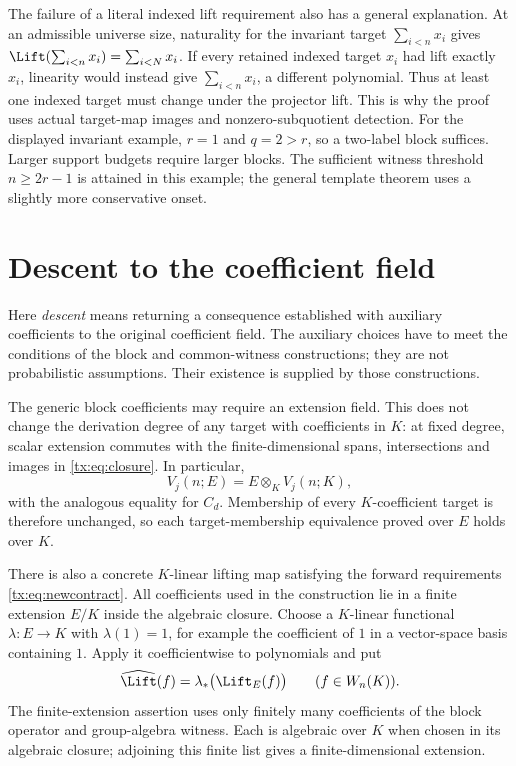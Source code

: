 The failure of a literal indexed lift requirement also has a general
explanation. At an admissible universe size, naturality for the invariant target
$\sum_{i<n}x_i$ gives
$\Lift(\sum_{i<n}x_i)=\sum_{i<N}x_i$. If every retained indexed
target $x_i$ had lift exactly $x_i$, linearity would instead give
$\sum_{i<n}x_i$, a different polynomial. Thus at least one indexed
target must change under the projector lift. This is why the proof
uses actual target-map images and nonzero-subquotient detection.
For the displayed invariant example,
$r=1$ and $q=2>r$, so a two-label block suffices. Larger
support budgets require larger blocks. The sufficient witness threshold
$n\ge2r-1$ is attained in this example; the general template theorem
uses a slightly more conservative onset.

\section{Descent to the coefficient field}\label{tx:lift-sec:descent}
Here \emph{descent} means returning a consequence established with
auxiliary coefficients to the original coefficient field.
The auxiliary choices have to meet the conditions of the block and
common-witness constructions; they are not probabilistic assumptions.
Their existence is supplied by those constructions.

The generic block coefficients may require an extension field. This
does not change the derivation degree of any target with coefficients in $K$: at fixed degree, scalar extension
commutes with the finite-dimensional spans, intersections and images
in \eqref{tx:eq:closure}. In particular,
\[
                       V_j(n;E)=E\otimes_K V_j(n;K),
\]
with the analogous equality for $C_d$. Membership of every $K$-coefficient target is therefore unchanged,
so each target-membership equivalence proved over $E$ holds over $K$.

There is also a concrete $K$-linear lifting map satisfying the forward
requirements \eqref{tx:eq:newcontract}. All coefficients used in the
construction lie in a finite extension $E/K$ inside the algebraic
closure. Choose a $K$-linear functional $\lambda:E\to K$ with
$\lambda(1)=1$, for example the coefficient of $1$ in a vector-space
basis containing $1$. Apply it coefficientwise to polynomials and put
\begin{equation}\label{tx:lift-eq:fieldlift}
                 \widehat\Lift(f)=\lambda_*\bigl(\Lift_E(f)\bigr)
                      \qquad(f\in W_n(K)).
\end{equation}
The finite-extension assertion uses only finitely many coefficients
of the block operator and group-algebra witness. Each is algebraic
over $K$ when chosen in its algebraic closure; adjoining this finite
list gives a finite-dimensional extension.

